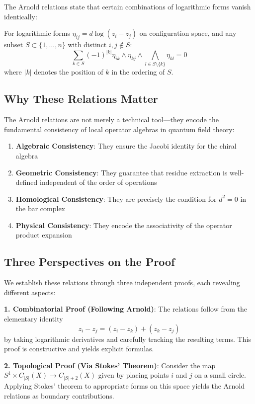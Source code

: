 The Arnold relations state that certain combinations of logarithmic forms vanish identically:

\begin{theorem}
For logarithmic forms $\eta_{ij} = d\log(z_i - z_j)$ on configuration space, and any subset $S \subset \{1, \ldots, n\}$ with distinct $i, j \notin S$:
$$\sum_{k \in S} (-1)^{|k|} \eta_{ik} \wedge \eta_{kj} \wedge \bigwedge_{l \in S\setminus\{k\}} \eta_{kl} = 0$$
where $|k|$ denotes the position of $k$ in the ordering of $S$.
\end{theorem}

\subsection{Why These Relations Matter}

The Arnold relations are not merely a technical tool—they encode the fundamental consistency of local operator algebras in quantum field theory:

\begin{enumerate}
\item \textbf{Algebraic Consistency}: They ensure the Jacobi identity for the chiral algebra
\item \textbf{Geometric Consistency}: They guarantee that residue extraction is well-defined independent of the order of operations
\item \textbf{Homological Consistency}: They are precisely the condition for $d^2 = 0$ in the bar complex
\item \textbf{Physical Consistency}: They encode the associativity of the operator product expansion
\end{enumerate}

\subsection{Three Perspectives on the Proof}

We establish these relations through three independent proofs, each revealing different aspects:

\textbf{1. Combinatorial Proof (Following Arnold)}:
The relations follow from the elementary identity
$$z_i - z_j = (z_i - z_k) + (z_k - z_j)$$
by taking logarithmic derivatives and carefully tracking the resulting terms. This proof is constructive and yields explicit formulas.

\textbf{2. Topological Proof (Via Stokes' Theorem)}:
Consider the map $S^1 \times C_{|S|}(X) \to C_{|S|+2}(X)$ given by placing points $i$ and $j$ on a small circle. Applying Stokes' theorem to appropriate forms on this space yields the Arnold relations as boundary contributions.

